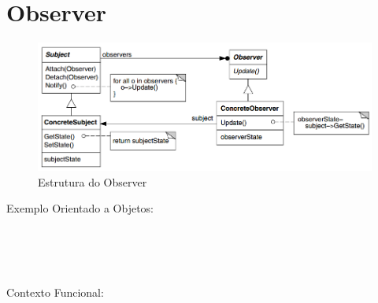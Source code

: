 \section{Observer}

\begin{figure}[htb]
	\caption{\label{fig_grafico}Estrutura do Observer}
	\begin{center}
	    \includegraphics[scale=0.5]{5_padroes-contexto-funcional/5.3_comportamentais/5.3.07_observer/diagram.png}
	\end{center}
\end{figure}

Exemplo Orientado a Objetos:

\begin{lstlisting}[caption={Observer Orientação a Objetos},label=ooobserver]


    
\end{lstlisting}

Contexto Funcional:


\begin{lstlisting}[caption={Observer Funcional},label=fpobserver]
    

    
\end{lstlisting}